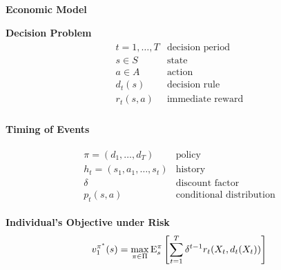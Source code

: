 \begin{frame}\begin{center}
\LARGE\textbf{Economic Model}
\end{center}\end{frame}
\begin{frame}
\textbf{Decision Problem}
\begin{align*}\begin{array}{ll}
t = 1, \hdots, T& \text{decision period} \\
s\in S & \text{state}  \\
a\in A & \text{action} \\
d_t(s) & \text{decision rule} \\
r_t(s, a) & \text{immediate reward}\\
\end{array}\end{align*}
\end{frame}
\begin{frame}
\begin{center}\textbf{Timing of Events}\vspace{0.9cm}
\scalebox{0.9}{\hspace{-0.2cm}}
\end{center}
\end{frame}
\begin{frame}
\begin{align*}\begin{array}{ll}
\pi = (d_1, \hdots, d_T) & \text{policy}\\
h_t = (s_1, a_1, \hdots, s_t) & \text{history} \\
\delta & \text{discount factor} \\
p_t(s, a) & \text{conditional distribution}
\end{array}\end{align*}
\end{frame}
\begin{frame}
\textbf{Individual's Objective under Risk}\vspace{0.3cm}
\begin{align*}
v^{\pi^*}_1(s) = \max_{\pi\in\Pi} \mathrm{E}_{s}^\pi\left[\sum^{T}_{t = 1}  \delta^{t - 1} r_t(X_t, d_t(X_t))\right]
\end{align*}
\end{frame}
